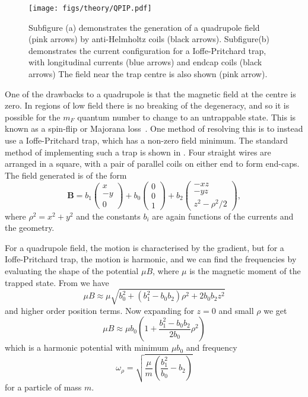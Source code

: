 \begin{figure}
  \centering
  \texttt{[image: figs/theory/QPIP.pdf]}
  \caption[Quadrupole and Ioffe-Pritchard traps]{
    Subfigure (a) demonstrates the generation of a quadrupole field
    (pink arrows) by
  anti-Helmholtz coils (black arrows). Subfigure(b) demonstrates the current
  configuration for a
  Ioffe-Pritchard trap, with longitudinal currents (blue arrows) and endcap
coils (black arrows) The field near the trap centre is also shown (pink arrow).
}
  \label{theory:fig:fields}
\end{figure}

One of the drawbacks to a quadrupole is that the magnetic field at the centre
is zero. In regions of low field there is no breaking of the degeneracy, and so
it is possible for the $m_F$ quantum number to change to an untrappable state.
This is known as a spin-flip or Majorana loss~\cite{Brink2006}. One method of
  resolving this is to instead use a Ioffe-Pritchard trap, which has a non-zero
field minimum. The standard method of implementing such a trap is shown in
. Four straight wires are arranged in a
square, with a pair of parallel coils on either end to form end-caps. The field
generated is of the form
%
\begin{equation}
  \mathbf{B} = b_1 \begin{pmatrix} x \\ -y \\ 0 \end{pmatrix}
  + b_0 \begin{pmatrix} 0 \\ 0 \\ 1 \end{pmatrix}
  + b_2 \begin{pmatrix} -xz \\ -yz \\ z^2 - \rho^2/2 \end{pmatrix},
  \label{theory:eqn:IP}
\end{equation}
%
where $\rho^2 = x^2 + y^2$ and the constants $b_i$ are again functions
of the currents and the geometry.

For a quadrupole field, the motion is characterised by the gradient, but for a
Ioffe-Pritchard trap, the motion is harmonic, and we can find the frequencies
by evaluating the shape of the potential $\mu B$, where $\mu$ is the magnetic
moment of the trapped state. From  we have
%
\begin{equation}
  \mu B \approx \mu \sqrt{b_0^2 + (b_1^2 -
  b_0b_2)\rho^2 + 2b_0b_2z^2}
\end{equation}
%
and higher order position terms. Now expanding for $z=0$ and small $\rho$ we get
%
\begin{equation}
  \mu B \approx \mu b_0\left(1 + \frac{b_1^2 -
    b_0b_2}{2b_0}\rho^2\right)
\end{equation}
%
which is a harmonic potential with minimum $\mu b_0$ and frequency
%
\begin{equation}
  \omega_\rho = \sqrt{\frac{\mu}{m}\left(\frac{b_1^2}{b_0}-b_2\right)}
\end{equation}
%
for a particle of mass $m$.

